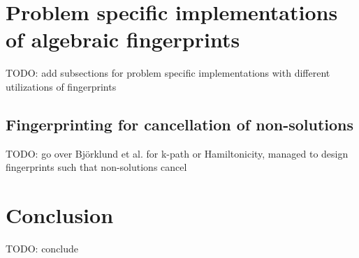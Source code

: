 \section{Problem specific implementations of algebraic fingerprints}

TODO: add subsections for problem specific implementations with different utilizations of fingerprints

\subsection{Fingerprinting for cancellation of non-solutions}

TODO: go over Björklund et al. for k-path or Hamiltonicity, managed to design fingerprints such that non-solutions cancel

\section{Conclusion}

TODO: conclude
